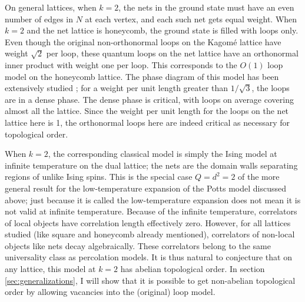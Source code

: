 \documentclass[11pt]{article}
\begin{document}
On general lattices, when $k=2$, the nets in the ground state must
have an even number of edges in $N$ at each vertex, and each such net
gets equal weight. When $k=2$ and the net lattice is honeycomb, the
ground state is filled with loops only. Even though the original
non-orthonormal loops on the Kagom\'e lattice have weight $\sqrt{2}$
per loop, these quantum loops on the net lattice have an orthonormal
inner product with weight one per loop. This corresponds to the
$O(1)$ loop model on the honeycomb lattice.  The phase diagram of this
model has been extensively studied \cite{Nienhuis}; for a weight per
unit length greater than $1/\sqrt{3}$, the loops are in a dense
phase. The dense phase is critical, with loops on average covering
almost all the lattice. Since the weight per unit length for the loops
on the net lattice here is 1, the orthonormal loops here are indeed
critical as necessary for topological order. 


When $k=2$, the corresponding classical model is simply the Ising
model at infinite temperature on the dual lattice; the nets are the
domain walls separating regions of unlike Ising spins. This is the
special case $Q=d^2=2$ of the more general result for the
low-temperature expansion of the Potts model discussed above; just
because it is called the low-temperature expansion does not mean it is
not valid at infinite temperature. Because of the infinite
temperature, correlators of local objects have correlation length
effectively zero. However, for all lattices studied (like square and
honeycomb already mentioned), correlators of non-local objects like
nets decay algebraically. These correlators belong to the same
universality class as percolation models. It is thus natural to
conjecture that on any lattice, this model at $k=2$ has abelian
topological order. In section \ref{sec:generalizations}, I will show
that it is possible to get non-abelian topological order by allowing
vacancies into the (original) loop model.
\end{document}
